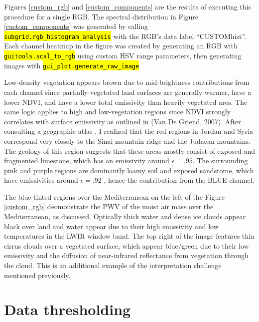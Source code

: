 \documentclass[12pt]{article}
\newcommand{\hltexttt}[1]{\texttt{\hl{#1}}}
\begin{document}
Figures \ref{custom_rgb} and \ref{custom_components} are the results of executing this procedure for a single RGB. The spectral distribution in Figure \ref{custom_components} was generated by calling \hltexttt{subgrid.rgb\_histogram\_analysis} with the RGB's data label ``CUSTOMhist''. Each channel heatmap in the figure was created by generating an RGB with \hltexttt{guitools.scal\_to\_rgb} using custom HSV range parameters, then generating images with \hltexttt{gui\_plot.generate\_raw\_image}.

 Low-density vegetation appears brown due to mid-brightness contributions from each channel since partially-vegetated land surfaces are generally warmer, have a lower NDVI, and have a lower total emissivity than heavily vegetated ares. The same logic applies to high and low-vegetation regions since NDVI strongly correlates with surface emissivity as outlined in (Van De Griend, 2007)\cite{griend2007}. After consulting a geographic atlas \cite{compactworldatlas}, I realized that the red regions in Jordan and Syria correspond very closely to the Sinai mountain ridge and the Judaean mountains. The geology of this region suggests that these areas mostly consist of exposed and fragmented limestone, which has an emissivity around $\epsilon=.95$. The surrounding pink and purple regions are dominantly loamy soil and exposed sandstome, which have emissivities around $\epsilon=.92$ \cite{compactworldatlas}\cite{mineo2021}\cite{bentor1980}, hence the contribution from the BLUE channel.

The blue-tinted regions over the Mediterranean on the left of the Figure \ref{custom_rgb} deomonstrate the PWV of the moist air mass over the Mediterranean, as discussed. Optically thick water and dense ice clouds appear black over land and water appear due to their high emissivity and low temperatures in the LWIR window band. The top right of the image features thin cirrus clouds over a vegetated surface, which appear blue/green due to their low emissivity and the diffusion of near-infrared reflectance from vegetation through the cloud. This is an additional example of the interpretation challenge mentioned previously.

\clearpage

\section{Data thresholding}
\end{document}
